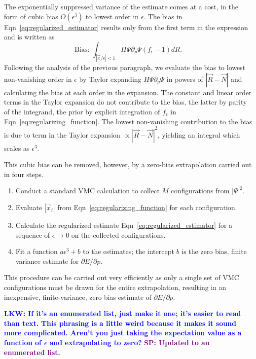 \documentclass[twocolumn]{revtex4-1}
\newcommand{\lucas}[1]{\textbf{\textcolor{blue}{LKW: #1}}}
\newcommand{\shivesh}[1]{\textbf{\textcolor{purple}{SP: #1}}}
\begin{document}
The exponentially suppressed variance of the estimate comes at a cost, in the form of cubic bias $O(\epsilon^3)$ to lowest order in $\epsilon$.
The bias in Eqn~\ref{eq:regularized_estimator} results only from the first term in the expression and is written as
\begin{equation}
\text{Bias: } \int_{|\vec{x}/\epsilon|< 1} H\Psi \partial_p \Psi (f_\epsilon - 1) dR.
\label{eq:estimator_bias}
\end{equation}
Following the analysis of the previous paragraph, we evaluate the bias to lowest non-vanishing order in $\epsilon$ by Taylor expanding $H\Psi \partial_p\Psi$ in powers of $|\vec{R} - \vec{N}|$ and calculating the bias at each order in the expansion.
The constant and linear order terms in the Taylor expansion do not contribute to the bias, the latter by parity of the integrand, the prior by explicit integration of $f_\epsilon$ in Eqn~\ref{eq:regularizing_function}.
The lowest non-vanishing contribution to the bias is due to term in the Taylor expansion $\propto |\vec{R} - \vec{N}|^2$, yielding an integral which scales as $\epsilon^3$.

This cubic bias can be removed, however, by a zero-bias extrapolation carried out in four steps.
\begin{enumerate}
\item Conduct a standard VMC calculation to collect $M$ configurations from $|\Psi|^2$.
\item Evaluate $|\vec{x}_i|$ from Eqn~\ref{eq:regularizing_function} for each configuration.
\item Calculate the regularized estimate Eqn~\ref{eq:regularized_estimator} for a sequence of $\epsilon \rightarrow 0$ on the collected configurations.
\item Fit a function $a\epsilon^3 + b$ to the estimates; the intercept $b$ is the zero bias, finite variance estimate for $\partial E/\partial p$.
\end{enumerate}
This procedure can be carried out very efficiently as only a single set of VMC configurations must be drawn for the entire extrapolation, resulting in an inexpensive, finite-variance, zero bias estimate of $\partial E/\partial p$.

\lucas{If it's an enumerated list, just make it one; it's easier to read than text. This phrasing is a little weird because it makes it sound more complicated. Aren't you just taking the expectation value as a function of $\epsilon$ and extrapolating to zero?} 
\shivesh{Updated to an enumerated list.}
\end{document}
